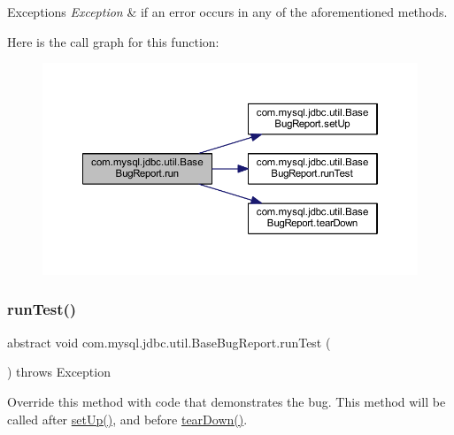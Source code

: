 \begin{DoxyExceptions}{Exceptions}
{\em Exception} & if an error occurs in any of the aforementioned methods. \\
\hline
\end{DoxyExceptions}
Here is the call graph for this function\+:
\nopagebreak
\begin{figure}[H]
\begin{center}
\leavevmode
\includegraphics[width=350pt]{classcom_1_1mysql_1_1jdbc_1_1util_1_1_base_bug_report_ab8d6a080a34fed2a99c651d1d5870eb1_cgraph}
\end{center}
\end{figure}
\mbox{\label{classcom_1_1mysql_1_1jdbc_1_1util_1_1_base_bug_report_ad870550c2d0f04bc0286066d8d8ebe5f}} 
\subsubsection{\texorpdfstring{run\+Test()}{runTest()}}
{\footnotesize\ttfamily abstract void com.\+mysql.\+jdbc.\+util.\+Base\+Bug\+Report.\+run\+Test (\begin{DoxyParamCaption}{ }\end{DoxyParamCaption}) throws Exception\hspace{0.3cm}{\ttfamily [abstract]}}

Override this method with code that demonstrates the bug. This method will be called after \mbox{\hyperlink{classcom_1_1mysql_1_1jdbc_1_1util_1_1_base_bug_report_aad06cc210e16377a2837266b087ea2ce}{set\+Up()}}, and before \mbox{\hyperlink{classcom_1_1mysql_1_1jdbc_1_1util_1_1_base_bug_report_a7fd16c03e3e8778c75cb64274e1349de}{tear\+Down()}}.


